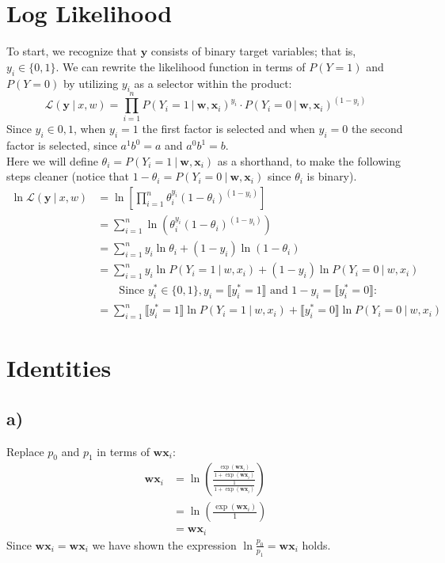 \documentclass{article}
\renewcommand{\vec}[1]{%
	\mathbf{#1}%
}
\newcommand{\gv}{%
	\:|\:
}
\begin{document}
	\section{Log Likelihood}
	To start, we recognize that $\vec{y}$ consists of binary target variables; that is, $y_i \in \{0,1\}$. We can rewrite the likelihood function in terms of $P(Y=1)$ and $P(Y=0)$ by utilizing $y_i$ as a selector within the product:
	\begin{equation*}
		\mathcal{L}(\vec{y}\gv x,w) = \prod_{i=1}^n P(Y_i=1\gv \vec{w},\vec{x}_i)^{y_i}\cdot P(Y_i = 0\gv \vec{w},\vec{x}_i)^{(1-y_i)}
	\end{equation*}
	Since $y_i\in{0,1}$, when $y_i=1$ the first factor is selected and when $y_i=0$ the second factor is selected, since $a^1b^0=a$ and $a^0b^1=b$.\\
	Here we will define $\theta_i = P(Y_i = 1 \gv  \vec{w},\vec{x}_i)$ as a shorthand, to make the following steps cleaner (notice that $1-\theta_i = P(Y_i = 0\gv \vec{w},\vec{x}_i)$ since $\theta_i$ is binary).
	\begin{align*}
		\ln\mathcal{L}(\vec{y}\gv x,w) &= \ln\left[ \prod_{i=1}^n \theta_i^{y_i}(1-\theta_i)^{(1-y_i)} \right]\\
		&= \sum_{i=1}^n \ln(\theta_i^{y_i}(1-\theta_i)^{(1-y_i)})\\
		&= \sum_{i=1}^n y_i\ln\theta_i + (1-y_i)\ln(1-\theta_i)\\
		&= \boxed{\sum_{i=1}^n y_i\ln P(Y_i = 1\gv w,x_i) + (1-y_i)\ln P(Y_i = 0\gv w,x_i )}\\
		& \qquad\text{Since }y_i^* \in \{0,1\},y_i = \llbracket y_i^* = 1\rrbracket \text{ and } 1 - y_i = \llbracket y_i^* = 0 \rrbracket:\\
		&= \boxed{\sum_{i=1}^n \llbracket y_i^* = 1\rrbracket\ln P(Y_i = 1\gv w,x_i) + \llbracket y_i^* = 0 \rrbracket\ln P(Y_i = 0\gv w,x_i)}
	\end{align*}
	
	
	\section{Identities}
	\subsection*{a)}
	Replace $p_0$ and $p_1$ in terms of $\vec{w}\vec{x}_i$:
	\begin{align*}
		\vec{w}\vec{x}_i &=
		\ln\left( \frac{\frac{\exp(\vec{w}\vec{x}_i)}{1+\exp(\vec{w}\vec{x}_i)}}{\frac{1}{1+\exp(\vec{w}\vec{x}_i)}} \right)\\
		&= \ln\left( \frac{\exp(\vec{w}\vec{x}_i)}{1} \right)\\
		&= \vec{w}\vec{x}_i
	\end{align*}
	Since $\vec{w}\vec{x}_i = \vec{w}\vec{x}_i$ we have shown the expression $\ln\frac{p_0}{p_1} = \vec{w}\vec{x}_i$ holds.
	
\end{document}
